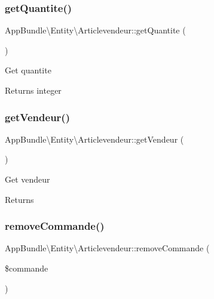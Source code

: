 \subsubsection{\texorpdfstring{get\+Quantite()}{getQuantite()}}
{\footnotesize\ttfamily App\+Bundle\textbackslash{}\+Entity\textbackslash{}\+Articlevendeur\+::get\+Quantite (\begin{DoxyParamCaption}{ }\end{DoxyParamCaption})}

Get quantite

\begin{DoxyReturn}{Returns}
integer 
\end{DoxyReturn}
\mbox{\label{class_app_bundle_1_1_entity_1_1_articlevendeur_ae5ad9607b100d9b00e73bf694486fbb2}} 
\subsubsection{\texorpdfstring{get\+Vendeur()}{getVendeur()}}
{\footnotesize\ttfamily App\+Bundle\textbackslash{}\+Entity\textbackslash{}\+Articlevendeur\+::get\+Vendeur (\begin{DoxyParamCaption}{ }\end{DoxyParamCaption})}

Get vendeur

\begin{DoxyReturn}{Returns}

\end{DoxyReturn}
\mbox{\label{class_app_bundle_1_1_entity_1_1_articlevendeur_a8b0b8ca20c3b7423bd6b456fe8e0df7d}} 
\subsubsection{\texorpdfstring{remove\+Commande()}{removeCommande()}}
{\footnotesize\ttfamily App\+Bundle\textbackslash{}\+Entity\textbackslash{}\+Articlevendeur\+::remove\+Commande (\begin{DoxyParamCaption}\item[{\textbackslash{}\hyperlink{class_app_bundle_1_1_entity_1_1_commande}{App\+Bundle\textbackslash{}\+Entity\textbackslash{}\+Commande}}]{\$commande }\end{DoxyParamCaption})}

